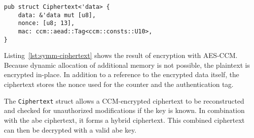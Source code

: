 \begin{lstlisting}[caption={Symmetric Ciphertext struct},label={lst:symm-ciphertext}]
pub struct Ciphertext<'data> {
    data: &'data mut [u8],
    nonce: [u8; 13],
    mac: ccm::aead::Tag<ccm::consts::U10>,
}
\end{lstlisting}

Listing~\ref{lst:symm-ciphertext} shows the result of encryption with AES-CCM.
Because dynamic allocation of additional memory is not possible, the plaintext is encrypted in-place.
In addition to a reference to the encrypted data itself, the ciphertext stores the nonce used for the counter and the authentication tag.

The \texttt{Ciphertext} struct allows a CCM-encrypted ciphertext to be reconstructed and checked for unauthorized modifications if the key is known.
In combination with the \acrshort{abe} ciphertext, it forms a hybrid ciphertext.
This combined ciphertext can then be decrypted with a valid \acrshort{abe} key.





